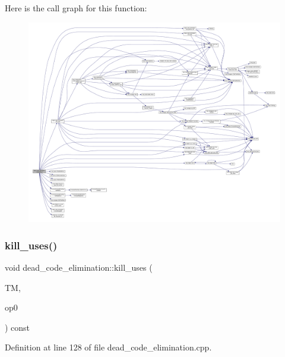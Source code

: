 Here is the call graph for this function\+:
\nopagebreak
\begin{figure}[H]
\begin{center}
\leavevmode
\includegraphics[width=350pt]{d5/d8b/classdead__code__elimination_a49b1c6bb467f000a41973440b21180ac_cgraph}
\end{center}
\end{figure}
\mbox{\label{classdead__code__elimination_af489c33b5908e6b2a9cb967022ee37da}} 
\subsubsection{\texorpdfstring{kill\+\_\+uses()}{kill\_uses()}}
{\footnotesize\ttfamily void dead\+\_\+code\+\_\+elimination\+::kill\+\_\+uses (\begin{DoxyParamCaption}\item[{const \hyperlink{tree__manager_8hpp_a96ff150c071ce11a9a7a1e40590f205e}{tree\+\_\+manager\+Ref}}]{TM,  }\item[{\hyperlink{tree__node_8hpp_a6ee377554d1c4871ad66a337eaa67fd5}{tree\+\_\+node\+Ref}}]{op0 }\end{DoxyParamCaption}) const\hspace{0.3cm}{\ttfamily [private]}}



Definition at line 128 of file dead\+\_\+code\+\_\+elimination.\+cpp.



